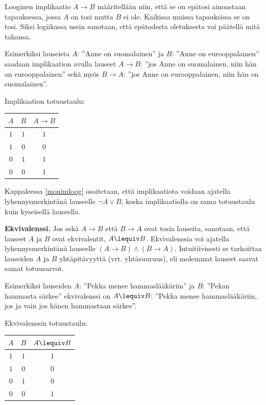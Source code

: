 Looginen implikaatio $A\to B$  määritellään niin, että se on epätosi ainoastaan tapauksessa, jossa $A$ on tosi mutta $B$ ei ole. Kaikissa muissa tapauksissa se on tosi. Siksi logiikassa usein sanotaan, että epätodesta oletuksesta voi päätellä mitä tahansa.

Esimerkiksi lauseista $A$: ''Anne on suomalainen'' ja $B$: ''Anne on eurooppalainen'' saadaan implikaation avulla lauseet $A \to B$: ''jos Anne on suomalainen, niin hän on eurooppalainen'' sekä myös $B \to A$: ''jos Anne on eurooppalainen, niin hän on suomalainen''. 

Implikaation totuustaulu:

\bigskip

\begin{center}
\begin{tabular}{|c|c|c|}\hline
$A$ & $B$ & $A \to B$ \\ \hline
$1$ & $1$ & $1$\\ %
$1$ & $0$ & $0$\\
$0$ & $1$ & $1$\\
$0$ & $0$ & $1$\\ \hline
\end{tabular}
\end{center}

\bigskip

Kappaleessa \ref{monimloog} osoitetaan, että implikaatiota voidaan ajatella lyhennysmerkintänä lauseelle $\lnot A \lor B$, koska implikaatiolla on sama totuustaulu kuin kyseisellä lauseella.


{\bf Ekvivalenssi.} Jos sekä $A\to B$ että $B\to A$ ovat tosia lauseita, sanotaan, että lauseet $A$ ja $B$ ovat ekvivalentit, $A \lequiv B$. Ekvivalenssia voi ajatella lyhennysmerkintänä lauseelle $(A\to B) \land (B\to A)$. Intuitiivisesti se tarkoittaa lauseiden $A$ ja $B$ yhtäpitävyyttä (vrt. yhtäsuuruus), eli molemmat lauseet saavat samat totuusarvot.

Esimerkiksi lauseiden $A$: ''Pekka menee hammaslääkäriin'' ja $B$: ''Pekan hammasta särkee'' ekvivalenssi on $A \lequiv B$: ''Pekka menee hammaslääkäriin, jos ja vain jos hänen hammastaan särkee''.

Ekvivalenssin totuustaulu:

\bigskip

\begin{center}
\begin{tabular}{|c|c|c|}\hline
$A$ & $B$ & $A \lequiv  B$ \\ \hline
$1$ & $1$ & $1$\\ %
$1$ & $0$ & $0$\\
$0$ & $1$ & $0$\\
$0$ & $0$ & $1$\\ \hline
\end{tabular}
\end{center}

